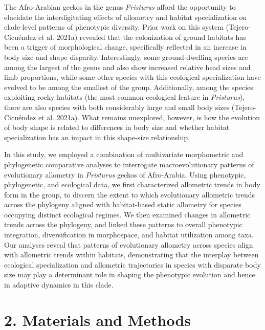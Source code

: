 \documentclass[
  11pt,
]{article}
\providecommand{\DIFaddtex}[1]{{\protect\color{blue}\uwave{#1}}} %
\providecommand{\DIFaddbegin}{} %
\providecommand{\DIFaddend}{} %
\providecommand{\DIFadd}[1]{\texorpdfstring{\DIFaddtex{#1}}{#1}} %
\newcommand{\DIFaddincludegraphics}[2][]{{\color{blue}\fbox{\DIFOincludegraphics[#1]{#2}}}} %
\DeclareRobustCommand{\DIFaddbegin}{\DIFOaddbegin \let\includegraphics\DIFaddincludegraphics} %
\DeclareRobustCommand{\DIFaddend}{\DIFOaddend \let\includegraphics\DIFOincludegraphics} %
\begin{document}
The Afro-Arabian geckos in the genus \emph{Pristurus} afford the
opportunity to elucidate the interdigitating effects of allometry and
habitat specialization on clade-level patterns of phenotypic diversity.
Prior work on this system (Tejero-Cicuéndez et al. 2021a) revealed that
the colonization of ground habitats has been a trigger of morphological
change, specifically reflected in an increase in body size and shape
disparity. Interestingly, some ground-dwelling species are among the
largest of the genus and also show increased relative head sizes and
limb proportions, while some other species with this ecological
specialization have evolved to be among the smallest of the group.
Additionally, among the species exploiting rocky habitats (the most
common ecological feature in \emph{Pristurus}), there are also species
with both considerably large and small body sizes (Tejero-Cicuéndez et
al. 2021a). What remains unexplored, however, is how the evolution of
\DIFaddbegin \textbf{\DIFadd{CHANGE}} \DIFaddend body shape is related to differences in body size and
whether habitat specialization has an impact in this shape-size
relationship. \hfill\break

In this study, we employed a combination of multivariate morphometric
and phylogenetic comparative analyses to interrogate macroevolutionary
patterns of evolutionary allometry in \emph{Pristurus} geckos of
Afro-Arabia. Using phenotypic, phylogenetic, and ecological data, we
first characterized allometric trends in body form in the group, to
discern the extent to which evolutionary allometric trends across the
phylogeny aligned with habitat-based static allometry for species
occupying distinct ecological regimes. We then examined changes in
allometric trends across the phylogeny, and linked these patterns to
overall phenotypic integration, diversification in morphospace, and
habitat utilization among taxa. Our analyses reveal that patterns of
evolutionary allometry across species align with allometric trends
within habitats, demonstrating that the interplay between ecological
specialization and allometric trajectories in species with disparate
body size may play a determinant role in shaping the phenotypic
evolution and hence in adaptive dynamics in this clade.

\hypertarget{materials-and-methods}{%
\section{2. Materials and Methods}\label{materials-and-methods}}
\end{document}
